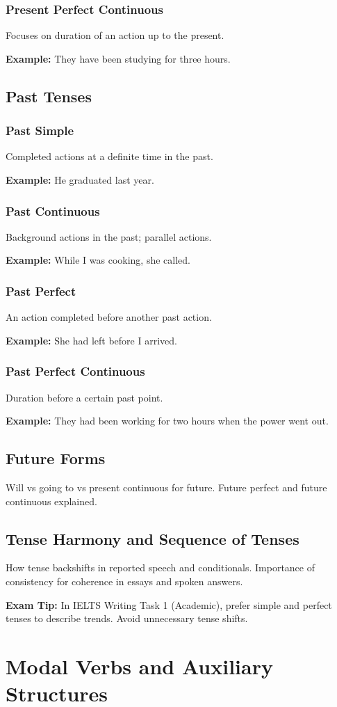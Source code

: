 \documentclass[12pt,oneside]{book}
\newcommand{\ex}[1]{\begin{examplebox}\textbf{Example:} #1\end{examplebox}}
\newcommand{\tip}[1]{\begin{examptip}\textbf{Exam Tip:} #1\end{examptip}}
\begin{document}
\subsection{Present Perfect Continuous}
Focuses on duration of an action up to the present.
\ex{They have been studying for three hours.}

\section{Past Tenses}
\subsection{Past Simple}
Completed actions at a definite time in the past.
\ex{He graduated last year.}
\subsection{Past Continuous}
Background actions in the past; parallel actions.
\ex{While I was cooking, she called.}
\subsection{Past Perfect}
An action completed before another past action.
\ex{She had left before I arrived.}
\subsection{Past Perfect Continuous}
Duration before a certain past point.
\ex{They had been working for two hours when the power went out.}

\section{Future Forms}
Will vs going to vs present continuous for future. Future perfect and future continuous explained.

\section{Tense Harmony and Sequence of Tenses}
How tense backshifts in reported speech and conditionals. Importance of consistency for coherence in essays and spoken answers.

\tip{In IELTS Writing Task 1 (Academic), prefer simple and perfect tenses to describe trends. Avoid unnecessary tense shifts.}

\chapter{Modal Verbs and Auxiliary Structures}
\end{document}
